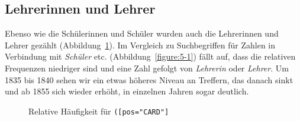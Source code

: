     \subsection{Lehrerinnen und Lehrer}

    Ebenso wie die Schülerinnen und Schüler wurden auch die Lehrerinnen und Lehrer gezählt (Abbildung~\ref{figure:5-4}). Im Vergleich zu Suchbegriffen für Zahlen in Verbindung mit \textit{Schüler} etc. (Abbildung~\ref{figure:5-1}) fällt auf, dass die relativen Frequenzen niedriger sind und eine Zahl gefolgt von \textit{Lehrerin} oder \textit{Lehrer}. Um 1835 bis 1840 sehen wir ein etwas höheres Niveau an Treffern, das danach sinkt und ab 1855 sich wieder erhöht, in einzelnen Jahren sogar deutlich. 
    
    \begin{figure}
        \caption{Relative Häufigkeit für \texttt{([pos="CARD"]\-[lemma="Lehr\-er|Lehrer\-in"]}}
        \label{figure:5-4} 
    \end{figure}



